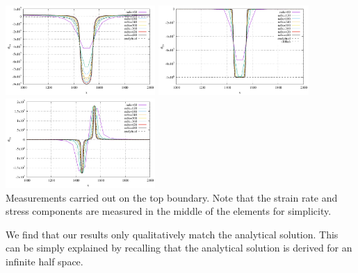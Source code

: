 \begin{center}
\includegraphics[width=5.7cm]{python_codes/fieldstone_34/results/exp4/top_profile_sigma_xx.pdf}
\includegraphics[width=5.7cm]{python_codes/fieldstone_34/results/exp4/top_profile_sigma_yy.pdf}
\includegraphics[width=5.7cm]{python_codes/fieldstone_34/results/exp4/top_profile_sigma_xy.pdf}\\
{\captionfont Measurements carried out on the top boundary.
Note that the strain rate and stress components are measured in the middle 
of the elements for simplicity.}
\end{center}

We find that our results only qualitatively match the analytical solution. This can 
be simply explained by recalling that the analytical solution is derived for an 
infinite half space. 



